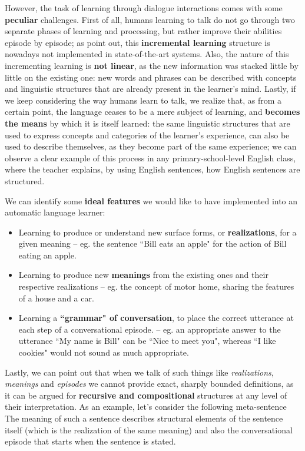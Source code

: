 However, the task of learning through dialogue interactions comes with some \textbf{peculiar} challenges. First of all, humans learning to talk do not go through two separate phases of learning and processing, but rather improve their abilities episode by episode; as \cite{2095408} point out, this \textbf{incremental learning} structure is nowadays not implemented in state-of-the-art systems. Also, the nature of this incrementing learning is \textbf{not linear}, as the new information was stacked little by little on the existing one: new words and phrases can be described with concepts and linguistic structures that are already present in the learner's mind. Lastly, if we keep considering the way humans learn to talk, we realize that, as from a certain point, the language ceases to be a mere subject of learning, and \textbf{becomes the means} by which it is itself learned: the same linguistic structures that are used to express concepts and categories of the learner's experience, can also be used to describe themselves, as they become part of the same experience; we can observe a clear example of this process in any primary-school-level English class, where the teacher explains, by using English sentences, how English sentences are structured.

We can identify some \textbf{ideal features} we would like to have implemented into an automatic language learner:
\begin{itemize}
	\item Learning to produce or understand new surface forms, or \textbf{realizations}, for a given meaning -- eg. the sentence ``Bill eats an apple" for the action of Bill eating an apple.
	\item Learning to produce new \textbf{meanings} from the existing ones and their respective realizations -- eg. the concept of motor home, sharing the features of a house and a car.
	\item Learning a \textbf{``grammar" of conversation}, to place the correct utterance at each step of a conversational episode. -- eg. an appropriate answer to the utterance ``My name is Bill" can be ``Nice to meet you", whereas ``I like cookies" would not sound as much appropriate.
\end{itemize}
Lastly, we can point out that when we talk of such things like \emph{realizations}, \emph{meanings} and \emph{episodes} we cannot provide exact, sharply bounded definitions, as it can be argued for \textbf{recursive and compositional} structures at any level of their interpretation. As an example, let's consider the following meta-sentence  The meaning of such a sentence describes structural elements of the sentence itself (which is the realization of the same meaning) and also the conversational episode that starts when the sentence is stated.

